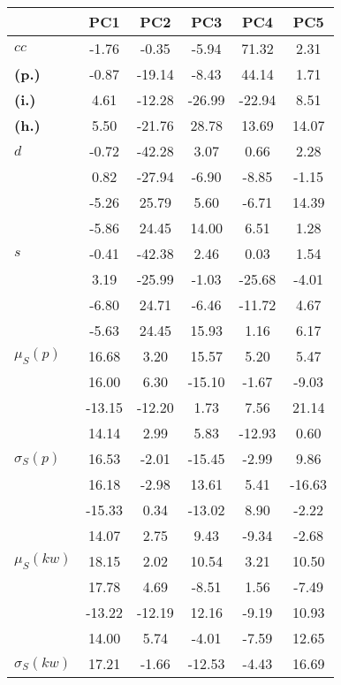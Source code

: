 \begin{table}[h!]
\begin{center}
\begin{tabular}{| l || c | c | c | c | c |}\hline
 & {\bf PC1} & {\bf PC2} & {\bf PC3} & {\bf PC4} & {\bf PC5} \\\hline\hline
{\bf $cc$} & -1.76 & -0.35 & -5.94 & 71.32 & 2.31 \\
{\bf (p.)} & -0.87 & -19.14 & -8.43 & 44.14 & 1.71 \\
{\bf (i.)} & 4.61 & -12.28 & -26.99 & -22.94 & 8.51 \\
{\bf (h.)} & 5.50 & -21.76 & 28.78 & 13.69 & 14.07 \\\hline
{\bf $d$} & -0.72 & -42.28 & 3.07 & 0.66 & 2.28 \\
{\bf } & 0.82 & -27.94 & -6.90 & -8.85 & -1.15 \\
{\bf } & -5.26 & 25.79 & 5.60 & -6.71 & 14.39 \\
{\bf } & -5.86 & 24.45 & 14.00 & 6.51 & 1.28 \\\hline
{\bf $s$} & -0.41 & -42.38 & 2.46 & 0.03 & 1.54 \\
{\bf } & 3.19 & -25.99 & -1.03 & -25.68 & -4.01 \\
 & -6.80  & 24.71  & -6.46  & -11.72  & 4.67 \\
 & -5.63  & 24.45  & 15.93  & 1.16  & 6.17 \\\hline
$\mu_S(p)$ & 16.68  & 3.20  & 15.57  & 5.20  & 5.47 \\
 & 16.00  & 6.30  & -15.10  & -1.67  & -9.03 \\
 & -13.15  & -12.20  & 1.73  & 7.56  & 21.14 \\
 & 14.14  & 2.99  & 5.83  & -12.93  & 0.60 \\\hline
$\sigma_S(p)$ & 16.53  & -2.01  & -15.45  & -2.99  & 9.86 \\
 & 16.18  & -2.98  & 13.61  & 5.41  & -16.63 \\
 & -15.33  & 0.34  & -13.02  & 8.90  & -2.22 \\
 & 14.07  & 2.75  & 9.43  & -9.34  & -2.68 \\\hline
$\mu_S(kw)$ & 18.15  & 2.02  & 10.54  & 3.21  & 10.50 \\
 & 17.78  & 4.69  & -8.51  & 1.56  & -7.49 \\
 & -13.22  & -12.19  & 12.16  & -9.19  & 10.93 \\
 & 14.00  & 5.74  & -4.01  & -7.59  & 12.65 \\\hline
$\sigma_S(kw)$ & 17.21  & -1.66  & -12.53  & -4.43  & 16.69 \\

\end{tabular}
\end{center}
\end{table}

